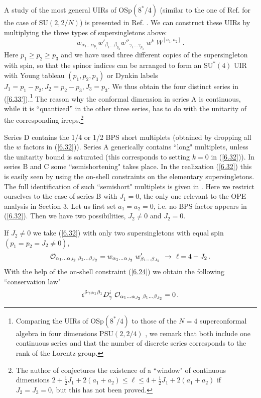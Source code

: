 \documentclass[a4paper,11pt]{article}
\begin{document}
A study of the most general UIRs of ${\mbox{OSp}}(8^*/4)$ (similar to the one
of Ref. \cite{dp} for the case of ${\mbox{SU}}(2,2/N)$) is presented in Ref.
\cite{Minw2}. We can construct these UIRs by multiplying the three types of
supersingletons above:
\begin{equation}\label{6.32}
  w_{\alpha_1\ldots\alpha_{p_1}}w'_{\beta_1\ldots\beta_{p_2}}
w''_{\gamma_1\ldots\gamma_{p_3}}\; w^k\; W^{[a_1,a_2]}\,.
\end{equation}
Here $p_1\geq p_2 \geq p_3$ and we have used three different copies of the
supersingleton with spin, so that the spinor indices can be arranged to form an
${\mbox{SU}}^*(4)$ UIR with Young tableau $(p_1,p_2,p_3)$ or Dynkin labels
$J_1=p_1-p_2,J_2=p_2-p_3,J_3=p_3$. We thus obtain the four distinct series in
(\ref{6.33'}).\footnote{Comparing the UIRs of ${\mbox{OSp}}(8^*/4)$ to those
of the $N=4$ superconformal algebra in four dimensions $\mbox{PSU}(2,2/4)$
\cite{dp}, we remark that both include one continuous series and that the
number
of discrete series corresponds to the rank of the Lorentz group.} The reason
why the conformal dimension in series A is continuous, while it is
``quantized'' in the other three
series, has to do with the unitarity of the corresponding
irreps.\footnote{The author of \cite{Minw2} conjectures the existence of a
``window" of continuous dimensions $2 +\frac{1}{2}J_1+2(a_1+a_2)\leq \ell \leq 4
+\frac{1}{2}J_1+2(a_1+a_2)$ if $J_2=J_3=0$, but this has not been proved.}

Series D contains the 1/4 or 1/2 BPS short multiplets (obtained by dropping all
the $w$ factors in (\ref{6.32})). Series A generically contains ``long"
multiplets, unless the unitarity bound is saturated \cite{Minw2} (this
corresponds to setting $k=0$ in (\ref{6.32})). In series B and C some
``semishortening" takes place. In the realization (\ref{6.32}) this is easily
seen by using the on-shell constraints on the elementary supersingletons. The
full identification of such ``semishort" multiplets is given in \cite{FS1}.
Here we restrict ourselves to the case of series B with $J_1=0$, the only one
relevant to the OPE analysis in Section 3. Let us first set $a_1=a_2=0$, i.e.
no BPS factor appears in (\ref{6.32}). Then we have two possibilities, $J_2\neq
0$ and $J_2=0$.

If $J_2\neq 0$ we take (\ref{6.32}) with only two supersingletons with equal
spin $(p_1=p_2=J_2\neq0)$,
\begin{equation}\label{s4}
  {\cal O}_{\alpha_1\ldots\alpha_{J_2}\; \beta_1\ldots\beta_{J_2}} =
  w_{\alpha_1\ldots\alpha_{J_2}} \; w'_{\beta_1\ldots\beta_{J_2}}
  \ \rightarrow \ \ell = 4 +J_2 \,.
\end{equation}
With the help of the on-shell constraint (\ref{6.24}) we obtain the following
``conservation law"
\begin{equation}\label{6.3312}
  \epsilon^{\delta\gamma\alpha_1\beta_1} D^i_\gamma\;
  {\cal O}_{\alpha_1\ldots\alpha_{J_2}\; \beta_1\ldots\beta_{J_2}} = 0\,.
\end{equation}
\end{document}
